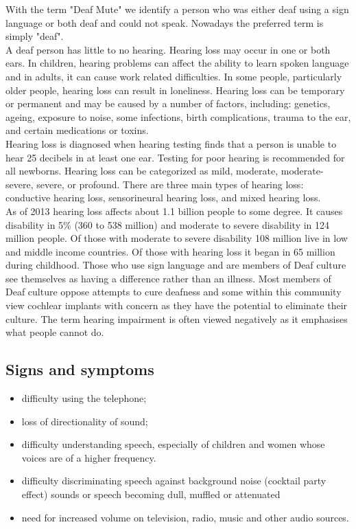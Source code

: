 \lhead{}
With the term "Deaf Mute" we identify a person who  was either deaf using a sign language or both deaf and could not speak. Nowadays the preferred term is simply "deaf".\\
A deaf person has little to no hearing. Hearing loss may occur in one or both ears. In children, hearing problems can affect the ability to learn spoken language and in adults, it can cause work related difficulties. In some people, particularly older people, hearing loss can result in loneliness. Hearing loss can be temporary or permanent and may be caused by a number of factors, including: genetics, ageing, exposure to noise, some infections, birth complications, trauma to the ear, and certain medications or toxins.\\
Hearing loss is diagnosed when hearing testing finds that a person is unable to hear 25 decibels in at least one ear. Testing for poor hearing is recommended for all newborns. Hearing loss can be categorized as mild, moderate, moderate-severe, severe, or profound. There are three main types of hearing loss: conductive hearing loss, sensorineural hearing loss, and mixed hearing loss.\\
As of 2013 hearing loss affects about 1.1 billion people to some degree. It causes disability in 5\% (360 to 538 million) and moderate to severe disability in 124 million people. Of those with moderate to severe disability 108 million live in low and middle income countries. Of those with hearing loss it began in 65 million during childhood. Those who use sign language and are members of Deaf culture see themselves as having a difference rather than an illness. Most members of Deaf culture oppose attempts to cure deafness and some within this community view cochlear implants with concern as they have the potential to eliminate their culture. The term hearing impairment is often viewed negatively as it emphasises what people cannot do.\\
\subsection*{Signs and symptoms}
\begin{itemize}
	\item difficulty using the telephone;
	\item loss of directionality of sound;
	\item difficulty understanding speech, especially of children and women whose voices are of a higher frequency.
	\item difficulty discriminating speech against background noise (cocktail party effect)
	sounds or speech becoming dull, muffled or attenuated
	\item need for increased volume on television, radio, music and other audio sources. 	
\end{itemize}

